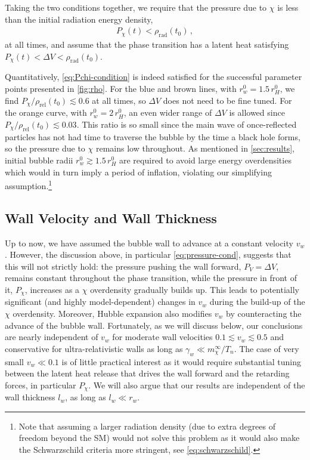 \documentclass[
onecolumn, %
11pt, %
tightenlines,
superscriptaddress, %
nofootinbib, %
preprintnumbers, %
prd %
]{revtex4-1}
\begin{document}
Taking the two conditions together, we require that the pressure due to $\chi$ is less than the initial radiation energy density,
%
\begin{align}
    P_\chi(t) < \rho_\text{rad}(t_0)\,,
    \label{eq:Pchi-condition}
\end{align}
%
at all times, and assume that the phase transition has a latent heat satisfying $P_\chi(t) < \Delta V < \rho_\text{rad}(t_0)$. 

Quantitatively, \cref{eq:Pchi-condition} is indeed satisfied for the successful parameter points presented in \cref{fig:rho}.  For the blue and brown lines, with $r_w^0 = 1.5\,r_H^0$, we find $P_\chi/\rho_\text{rel}(t_0) \lesssim 0.6$ at all times, so $\Delta V$ does not need to be fine tuned.  For the orange curve, with $r_w^0 = 2\,r_H^0$, an even wider range of $\Delta V$ is allowed since $P_\chi/\rho_\text{rel}(t_0) \lesssim 0.03$.  This ratio is so small since the main wave of once-reflected particles has not had time to traverse the bubble by the time a black hole forms, so the pressure due to $\chi$ remains low throughout. As mentioned in \cref{sec:results}, initial bubble radii $r_w^0 \gtrsim 1.5\,r_H^0$ are required to avoid large energy overdensities which would in turn imply a period of inflation, violating our simplifying assumption.\footnote{Note that assuming a larger radiation density (due to extra degrees of freedom beyond the SM) would not solve this problem as it would also make the Schwarzschild criteria more stringent, see \cref{eq:schwarzschild}.} 


\subsection{Wall Velocity and Wall Thickness}
\label{sec:dependence-wall-velocity}

Up to now, we have assumed the bubble wall to advance at a constant velocity $v_w$. However, the discussion above, in particular \cref{eq:pressure-cond}, suggests that this will not strictly hold: the pressure pushing the wall forward, $P_V = \Delta V$, remains constant throughout the phase transition, while the pressure in front of it, $P_\chi$, increases as a $\chi$ overdensity gradually builds up.  This leads to potentially significant (and highly model-dependent) changes in $v_w$ during the build-up of the $\chi$ overdensity. Moreover, Hubble expansion also modifies $v_w$ by counteracting the advance of the bubble wall. Fortunately, as we will discuss below, our conclusions are nearly independent of $v_w$ for moderate wall velocities $0.1 \lesssim v_w \lesssim 0.5$ and conservative for ultra-relativistic walls as long as $\gamma_w \ll m_\chi^\infty/T_n$. The case of very small $v_w \ll 0.1$ is of little practical interest as it would require substantial tuning between the latent heat release that drives the wall forward and the retarding forces, in particular $P_\chi$.  We will also argue that our results are independent of the wall thickness $l_w$, as long as $l_w \ll r_w$.
\end{document}
